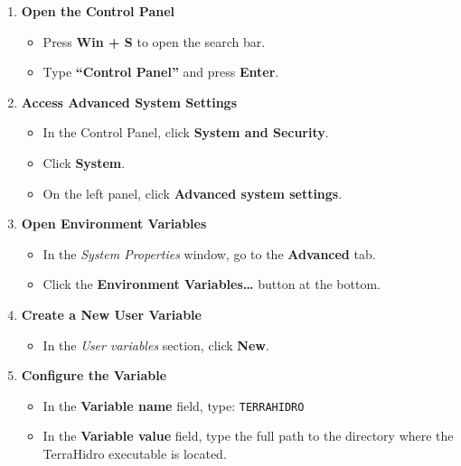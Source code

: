 \documentclass[
]{book}
\providecommand{\tightlist}{%
  \setlength{\itemsep}{0pt}\setlength{\parskip}{0pt}}
\theoremstyle{definition}
\theoremstyle{definition}
\theoremstyle{definition}
\theoremstyle{definition}
\theoremstyle{remark}
\begin{document}
\begin{enumerate}
\def\labelenumi{\arabic{enumi}.}
\tightlist
\item
  \textbf{Open the Control Panel}

  \begin{itemize}
  \tightlist
  \item
    Press \textbf{Win + S} to open the search bar.\\
  \item
    Type \textbf{``Control Panel''} and press \textbf{Enter}.
  \end{itemize}
\item
  \textbf{Access Advanced System Settings}

  \begin{itemize}
  \tightlist
  \item
    In the Control Panel, click \textbf{System and Security}.\\
  \item
    Click \textbf{System}.\\
  \item
    On the left panel, click \textbf{Advanced system settings}.
  \end{itemize}
\item
  \textbf{Open Environment Variables}

  \begin{itemize}
  \tightlist
  \item
    In the \emph{System Properties} window, go to the \textbf{Advanced} tab.\\
  \item
    Click the \textbf{Environment Variables\ldots{}} button at the bottom.
  \end{itemize}
\item
  \textbf{Create a New User Variable}

  \begin{itemize}
  \tightlist
  \item
    In the \emph{User variables} section, click \textbf{New}.
  \end{itemize}
\item
  \textbf{Configure the Variable}

  \begin{itemize}
  \tightlist
  \item
    In the \textbf{Variable name} field, type: \texttt{TERRAHIDRO}\\
  \item
    In the \textbf{Variable value} field, type the full path to the directory where the TerraHidro executable is located.


\end{itemize}
\end{enumerate}
\end{document}
